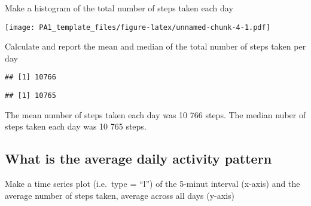 \documentclass[]{article}
\newenvironment{Shaded}{\begin{snugshade}}{\end{snugshade}}
\newcommand{\KeywordTok}[1]{\textcolor[rgb]{0.13,0.29,0.53}{\textbf{#1}}}
\newcommand{\DataTypeTok}[1]{\textcolor[rgb]{0.13,0.29,0.53}{#1}}
\newcommand{\DecValTok}[1]{\textcolor[rgb]{0.00,0.00,0.81}{#1}}
\newcommand{\StringTok}[1]{\textcolor[rgb]{0.31,0.60,0.02}{#1}}
\newcommand{\OperatorTok}[1]{\textcolor[rgb]{0.81,0.36,0.00}{\textbf{#1}}}
\newcommand{\NormalTok}[1]{#1}
\begin{document}
Make a histogram of the total number of steps taken each day

\begin{Shaded}
\end{Shaded}

\texttt{[image: PA1\_template\_files/figure-latex/unnamed-chunk-4-1.pdf]}

Calculate and report the mean and median of the total number of steps
taken per day

\begin{Shaded}
\end{Shaded}

\begin{verbatim}
## [1] 10766
\end{verbatim}

\begin{Shaded}
\end{Shaded}

\begin{verbatim}
## [1] 10765
\end{verbatim}

The mean number of steps taken each day was 10 766 steps. The median
nuber of steps taken each day was 10 765 steps.

\subsection{What is the average daily activity
pattern}\label{what-is-the-average-daily-activity-pattern}

Make a time series plot (i.e.~type = ``l'') of the 5-minut interval
(x-axis) and the average number of steps taken, average across all days
(y-axis)
\end{document}
